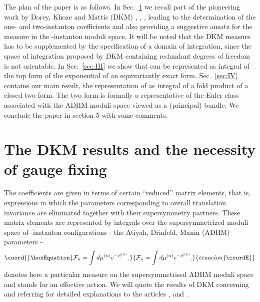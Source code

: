 \documentclass[a4paper,12pt]{article}
\begin{document}
The plan of the paper is as follows. In Sec.~\ref{sec:II} we recall 
part of the pioneering work by Dorey, 
Khoze and Mattis (DKM) \cite{dorey1}, \cite{dorey2}, \cite{dorey3}, 
leading to the determination of the one- and two-instanton 
coefficients \cite{dorey1}  and also providing a suggestive ansatz
for the measure in the \coordHE{}-instanton moduli space\cite{dorey3}. It 
will be noted that the DKM measure has to be supplemented by the 
specification of a domain of integration, since the space of 
integration proposed by DKM containing redundant degrees of 
freedom is not orientable. In Sec.~\ref{sec:III} we show that \coordHE{} 
can be represented as integral 
of the top form of the exponential of an 
equivariantly exact form.  Sec.~\ref{sec:IV} contains our main 
result, the representation of \coordHE{} as integral of a 
\coordHE{} fold product of a closed two-form. The two form is formally 
a representative of the Euler class associated with the ADHM moduli 
space viewed as a (principal) \coordHE{} bundle. 
We conclude the paper in section 5 with 
some comments. 

\section{The DKM results and the necessity of \coordHE{} gauge 
fixing}\label{sec:II}
The coefficients \coordHE{} are given in terms of certain ``reduced'' 
matrix elements, that is, expressions in which the parameters 
corresponding to overall translation invariance are eliminated 
together with their supersymmetry partners. These matrix 
elements are represented by integrals over the supersymmetrized 
moduli space of \coordHE{}-instanton configurations - the Atiyah, Drinfeld, 
Manin (ADHM) \cite{adhm} parameters - 
\begin{equation}\coord{}\boxEquation{
{\cal F}_n=\int d\mu^{(n)}e^{-S^{(n)}}.
\label{modspaceint}
}{
{\cal F}_n=\int d\mu^{(n)}e^{-S^{(n)}}.
}{ecuacion}\coordE{}\end{equation}
\coordHE{} denotes here a particular measure on the \coordHE{} 
supersymmetrised ADHM moduli space and \coordHE{} stands for an 
effective \coordHE{} action. We will quote the results of 
DKM concerning \coordHE{} and \coordHE{} referring for detailed 
explanations to the articles \cite{dorey1}, \cite{dorey2} and  
\cite{dorey3}. 
\end{document}

